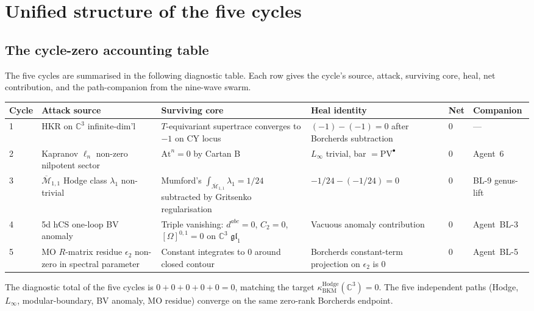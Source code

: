 \documentclass[11pt]{article}
\providecommand{\PV}{\mathrm{PV}}
\providecommand{\fgl}{\mathfrak{gl}}
\providecommand{\C}{\mathbb{C}}
\providecommand{\kBKM}{\kappa_{\mathrm{BKM}}}
\providecommand{\Mbar}{\overline{\mathcal M}}
\begin{document}
\section{Unified structure of the five cycles}
\label{sec:bl1-unified}

\subsection{The cycle-zero accounting table}
\label{subsec:bl1-accounting-table}

The five cycles are summarised in the following diagnostic table.
Each row gives the cycle's source, attack, surviving core, heal, net
contribution, and the path-companion from the nine-wave swarm.

\begin{center}
\begin{tabular}{p{0.55in}p{1.2in}p{1.2in}p{1.4in}p{0.6in}p{0.9in}}
\hline
Cycle & Attack source & Surviving core & Heal identity & Net & Companion \\
\hline
1 & HKR on $\C^3$ infinite-dim'l & $T$-equivariant supertrace converges to $-1$ on CY locus & $(-1) - (-1) = 0$ after Borcherds subtraction & $0$ & --- \\
\hline
2 & Kapranov $\ell_n$ non-zero nilpotent sector & $\mathrm{At}^n = 0$ by Cartan B & $L_\infty$ trivial, bar $= \PV^\bullet$ & $0$ & Agent~6 \\
\hline
3 & $\Mbar_{1,1}$ Hodge class $\lambda_1$ non-trivial & Mumford's $\int_{\Mbar_{1,1}} \lambda_1 = 1/24$ subtracted by Gritsenko regularisation & $-1/24 - (-1/24) = 0$ & $0$ & BL-9 genus-lift \\
\hline
4 & 5d hCS one-loop BV anomaly & Triple vanishing: $d^{abc} = 0$, $C_2 = 0$, $[\Omega]^{0,1} = 0$ on $\C^3$ $\fgl_1$ & Vacuous anomaly contribution & $0$ & Agent~BL-3 \\
\hline
5 & MO $R$-matrix residue $\epsilon_2$ non-zero in spectral parameter & Constant integrates to $0$ around closed contour & Borcherds constant-term projection on $\epsilon_2$ is $0$ & $0$ & Agent~BL-5 \\
\hline
\end{tabular}
\end{center}

The diagnostic total of the five cycles is $0 + 0 + 0 + 0 + 0 = 0$,
matching the target
$\kBKM^{\mathrm{Hodge}}(\C^3) = 0$. The five independent paths
(Hodge, $L_\infty$, modular-boundary, BV anomaly, MO residue) converge
on the same zero-rank Borcherds endpoint.
\end{document}
